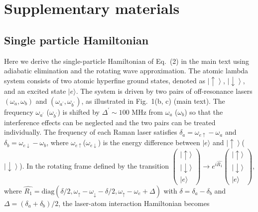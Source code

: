 \documentclass[twocolumn,prl,floatfix,citeautoscript,nofootinbib,superscriptaddress]{revtex4}
\begin{document}
\newpage \clearpage
\onecolumngrid
\appendix

\section{Supplementary materials}
\subsection{Single particle Hamiltonian}

Here we derive the single-particle Hamiltonian of Eq.~(2) in the main text
using adiabatic elimination and the rotating wave approximation. The atomic
lambda system consists of two atomic hyperfine ground states, denoted as $%
\left\vert \uparrow \right\rangle $, $\left\vert \downarrow \right\rangle $,
and an excited state $|e\rangle $. The system is driven by two pairs of
off-resonance lasers $(\omega _{a},\omega _{b})$ and $(\omega _{a^{\prime
}},\omega _{b^{\prime }})$, as illustrated in Fig.~1(b, c) (main text). The
frequency $\omega _{a^{\prime }}$ ($\omega _{b^{\prime }}$) is shifted by $%
\Delta ^{\prime }\sim 100$ MHz from $\omega _{a}$ ($\omega _{b}$) so that
the interference effects can be neglected and the two pairs can be treated
individually. The frequency of each Raman laser satisfies $\delta
_{a}=\omega _{e\uparrow }-\omega _{a}$ and $\delta _{b}=\omega _{e\downarrow
}-\omega _{b}$, where $\omega _{e\uparrow }$($\omega _{e\downarrow }$) is
the energy difference between $|e\rangle $ and $\left\vert \uparrow
\right\rangle $($\left\vert \downarrow \right\rangle $). In the rotating
frame defined by the transition $\left(
\begin{array}{c}
|\uparrow \rangle \\
|\downarrow \rangle \\
|e\rangle%
\end{array}%
\right) \rightarrow e^{i\widehat{R_{1}}}\left(
\begin{array}{c}
|\uparrow \rangle \\
|\downarrow \rangle \\
|e\rangle%
\end{array}%
\right) $, where $\widehat{R_{1}}=\text{diag}(\delta /2,\omega _{\uparrow
}-\omega _{\downarrow }-\delta /2,\omega _{\uparrow }-\omega _{e}+\Delta )$
with $\delta =\delta _{a}-\delta _{b}$ and $\Delta =\left( \delta
_{a}+\delta _{b}\right) /2$, the laser-atom interaction Hamiltonian becomes
\cite{Brion2007}
\end{document}
